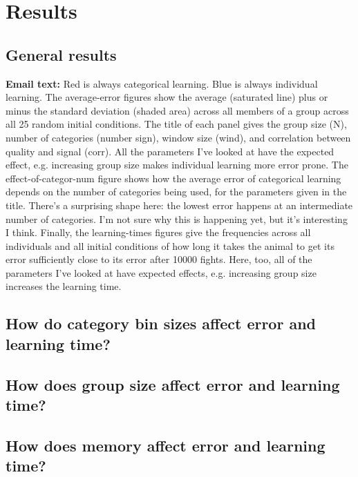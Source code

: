 \section*{Results}
%
\subsection*{General results}
%
\textbf{Email text: }Red is always categorical learning. Blue is always individual learning. The average-error figures show the average (saturated line) plus or minus the standard deviation (shaded area) across all members of a group across all 25 random initial conditions. The title of each panel gives the group size (N), number of categories (number sign), window size (wind), and correlation between quality and signal (corr). All the parameters I've looked at have the expected effect, e.g. increasing group size makes individual learning more error prone. The effect-of-categor-num figure shows how the average error of categorical learning depends on the number of categories being used, for the parameters given in the title. There's a surprising shape here: the lowest error happens at an intermediate number of categories. I'm not sure why this is happening yet, but it's interesting I think. Finally, the learning-times figures give the frequencies across all individuals and all initial conditions of how long it takes the animal to get its error sufficiently close to its error after 10000 fights. Here, too, all of the parameters I've looked at have expected effects, e.g. increasing group size increases the learning time.

%
\subsection*{How do category bin sizes affect error and learning time?}
%
\subsection*{How does group size affect error and learning time?}
%
\subsection*{How does memory affect error and learning time?}
%

